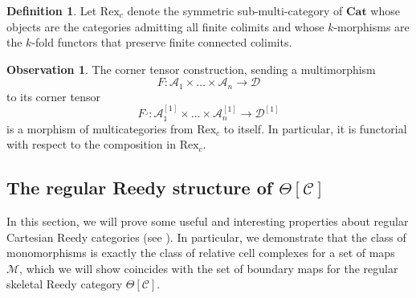 \documentclass[a4paper]{article}
\numberwithin{equation}{subsection}
\theoremstyle{plain}   %
\theoremstyle{definition}
\newtheorem{defn}[equation]{Definition}
\newtheorem{obs}[equation]{Observation}
\theoremstyle{remark}
\theoremstyle{plain}
\newcommand{\Cat}{\ensuremath{\mathbf{Cat}}}
\providecommand{\C}{}
\renewcommand{\C}{\ensuremath{\mathcal{C}}}
\begin{document}
\begin{defn} Let \(\mathrm{Rex}_c\) denote the symmetric sub-multi-category of \(\Cat\) whose objects are the categories admitting all finite colimits and whose \(k\)-morphisms are the \(k\)-fold functors that preserve finite connected colimits.
\end{defn}
\begin{obs}\label{cornertensorfunctoriality} The corner tensor construction, sending a multimorphism 
	\[F:\mathcal{A}_1\times\dots\times \mathcal{A}_n \to \mathcal{D}\] to its corner tensor
	\[F^\lrcorner:\mathcal{A}_1^{[1]}\times\dots\times \mathcal{A}_n^{[1]} \to \mathcal{D}^{[1]}\] is a morphism of multicategories from \(\mathrm{Rex}_c\) to itself.  In particular, it is functorial with respect to the composition in \(\mathrm{Rex}_c\).
\end{obs}
\subsection{The regular Reedy structure of \(\Theta[\C]\)}\label{reedy}
In this section, we will prove some useful and interesting properties about regular Cartesian Reedy categories (see ). In particular, we demonstrate that the class of monomorphisms is exactly the class of relative cell complexes for a set of maps \(\mathscr{M}\), which we will show coincides with the set of boundary maps for the regular skeletal Reedy category \(\Theta[\C]\).  
\end{document}

